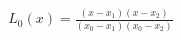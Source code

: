 \documentclass[preview]{standalone}
\begin{document}
\begin{align*}
L_0(x) = \frac{(x - x_1)(x - x_2)}{(x_0 - x_1)(x_0 - x_2)}
\end{align*}
\end{document}
